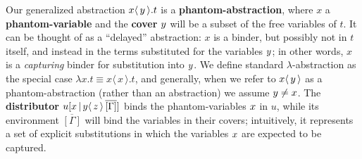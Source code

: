 \documentclass[runningheads]{llncs}
\let\vec\relax
\newcommand\defn{\textbf}
\newcommand{\abs}[2]{\lambda #1 . #2}
\newcommand{\fake}[3]{#1 \langle \, #2 \, \rangle . #3}
\newcommand{\dist}[5]{#1 [ #2 \, \vert \, \fakedist{#4}{#5} \, #3 ]}
\newcommand{\fakedist}[2]{#1 \langle \, #2 \, \rangle}
\begin{document}
Our generalized abstraction $\fake x{\vec y}t$ is a \defn{phantom-abstraction}, where $x$ a \defn{phantom-variable} and the \defn{cover} $\vec y$ will be a subset of the free variables of $t$. It can be thought of as a ``delayed'' abstraction: $x$ is a binder, but possibly not in $t$ itself, and instead in the terms substituted for the variables $\vec y$; in other words, $x$ is a \emph{capturing} binder for substitution into $\vec y$. We define standard $\lambda$-abstraction as the special case $\abs{x}{t} \equiv \fake{x}{x}{t}$, and generally, when we refer to $\fakedist x{\vec y}$ as a phantom-abstraction (rather than an abstraction) we assume $\vec y\neq x$. The \defn{distributor} $\dist{u}{\vec x}{\overline{[\Gamma]}}{y}{\vec z}$ binds the phantom-variables $\vec x$ in $u$, while its environment $\overline{[\Gamma]}$ will bind the variables in their covers; intuitively, it represents a set of explicit substitutions in which the variables $\vec x$ are expected to be captured.
\end{document}
